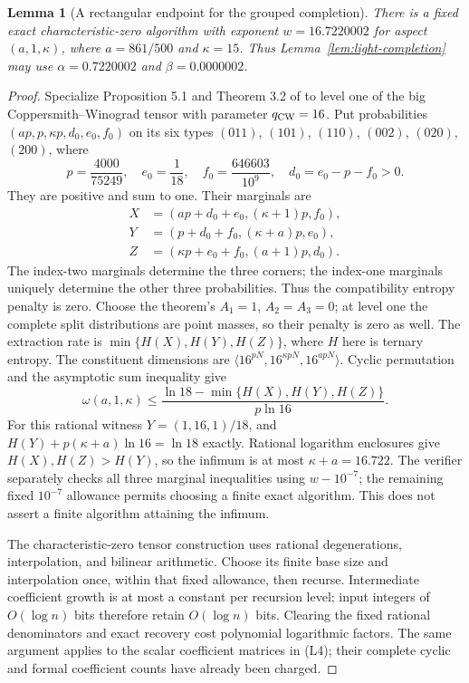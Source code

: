 \documentclass[11pt]{article}
\newtheorem{lemma}[theorem]{Lemma}
\begin{document}
\begin{lemma}[A rectangular endpoint for the grouped completion]
\label{lem:light-cw}
There is a fixed exact characteristic-zero algorithm with exponent
$w=16.7220002$ for aspect $(a,1,\kappa)$, where
$a=861/500$ and $\kappa=15$. Thus Lemma~\ref{lem:light-completion}
may use $\alpha=0.7220002$ and $\beta=0.0000002$.
\end{lemma}
\begin{proof}
Specialize Proposition 5.1 and Theorem 3.2 of \cite{VXXZ24}
to level one of the big Coppersmith--Winograd tensor with parameter
$q_{\rm CW}=16$. Put probabilities
$(ap,p,\kappa p,d_0,e_0,f_0)$ on its six types
$(011)$, $(101)$, $(110)$, $(002)$, $(020)$, $(200)$, where
\[
 p=\frac{4000}{75249},\quad e_0=\frac1{18},\quad
 f_0=\frac{646603}{10^9},\quad d_0=e_0-p-f_0>0.
\]
They are positive and sum to one. Their marginals are
\[
\begin{aligned}
 X&=(ap+d_0+e_0,(\kappa+1)p,f_0),\\
 Y&=(p+d_0+f_0,(\kappa+a)p,e_0),\\
 Z&=(\kappa p+e_0+f_0,(a+1)p,d_0).
\end{aligned}
\]
The index-two marginals determine the three corners; the index-one
marginals uniquely determine the other three probabilities.
Thus the compatibility entropy penalty is zero. Choose the theorem's
$A_1=1$, $A_2=A_3=0$; at level one the complete split distributions
are point masses, so their penalty is zero as well. The extraction
rate is $\min\{H(X),H(Y),H(Z)\}$, where $H$ here is ternary entropy.
The constituent dimensions are
$\langle16^{pN},16^{\kappa pN},16^{apN}\rangle$.
Cyclic permutation and the asymptotic sum inequality give
\[
 \omega(a,1,\kappa)\le
 \frac{\ln18-\min\{H(X),H(Y),H(Z)\}}{p\ln16}.
\]
For this rational witness $Y=(1,16,1)/18$, and
$H(Y)+p(\kappa+a)\ln16=\ln18$ exactly. Rational logarithm
enclosures give $H(X),H(Z)>H(Y)$, so the infimum is at most
$\kappa+a=16.722$. The verifier separately checks all three
marginal inequalities using $w-10^{-7}$; the remaining fixed
$10^{-7}$ allowance permits choosing a finite exact algorithm.
This does not assert a finite algorithm attaining the infimum.

The characteristic-zero tensor construction uses rational
degenerations, interpolation, and bilinear arithmetic. Choose its
finite base size and interpolation once, within that fixed allowance,
then recurse. Intermediate coefficient growth is at most a constant
per recursion level; input integers of $O(\log n)$ bits therefore
retain $O(\log n)$ bits. Clearing the fixed rational denominators
and exact recovery cost polynomial logarithmic factors. The same
argument applies to the scalar coefficient matrices in (L4);
their complete cyclic and formal coefficient counts have already
been charged.
\end{proof}
\end{document}
